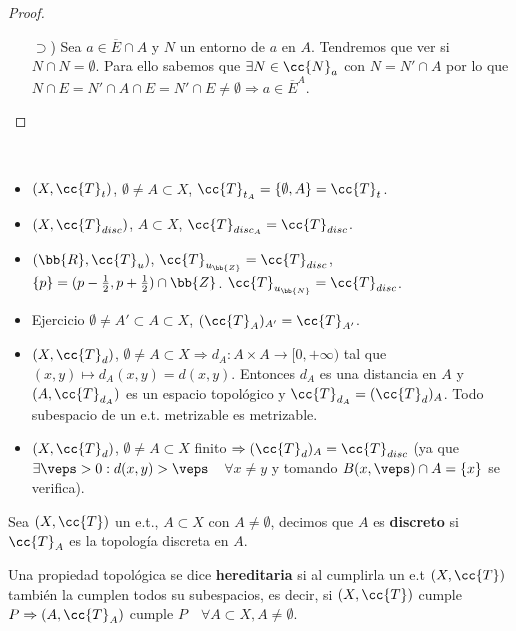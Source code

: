 \begin{prop}
\begin{proof}
\begin{enumerate}
\begin{itemize}
                \item[$\supset$)] Sea $a \in \overline{E}\cap A$ y $N$ un entorno de $a$ en $A$. Tendremos que ver si $N\cap N = \emptyset$. Para ello sabemos que $\exists N \in \cc{N}_a$ con $N=N'\cap A$ por lo que $N\cap E = N'\cap A \cap E = N' \cap E \neq \emptyset\Rightarrow a \in \overline{E}^A$.
            \end{itemize} 
        \end{enumerate}
    \end{proof}
\end{prop}

\begin{ejemplo}\
    \begin{itemize}
        \item $(X, \cc{T}_t)$, $\emptyset \neq A \subset X$, $\cc{T}_{t_A} = \{\emptyset, A\} = \cc{T}_t$.
        \item $(X, \cc{T}_{disc})$, $A\subset X$, $\cc{T}_{disc_A}=\cc{T}_{disc}$.
        \item $(\bb{R}, \cc{T}_u)$, $\cc{T}_{u_\bb{Z}} = \cc{T}_{disc}$, $\{p\} = (p-\frac{1}{2}, p+\frac{1}{2})\cap \bb{Z}$.
        $\cc{T}_{u_\bb{N}} = \cc{T}_{disc}$.
        \item Ejercicio $\emptyset \neq A' \subset A \subset X$, $(\cc{T}_A)_{A'} = \cc{T}_{A'}$.
        \item $(X, \cc{T}_d)$, $\emptyset\neq A \subset X \Rightarrow d_A: A\times A \to [0,+\infty)$ tal que $(x,y)\mapsto d_A(x,y) = d(x,y)$.
        Entonces $d_A$ es una distancia en $A$ y $(A, \cc{T}_{d_A})$ es un espacio topológico y $\cc{T}_{d_A} = (\cc{T}_d)_A$. Todo subespacio de un e.t. metrizable es metrizable.
        \item $(X, \cc{T}_d)$, $\emptyset \neq A \subset X$ finito $\Rightarrow (\cc{T}_d)_A = \cc{T}_{disc}$ (ya que $\exists \veps >0 : d(x,y)>\veps$\ \ $\forall x \neq y$ y tomando $B(x, \veps)\cap A =\{x\}$ se verifica).
    \end{itemize}
    \endsquare
\end{ejemplo}

\begin{definicion}
    Sea $(X, \cc{T})$ un e.t., $A\subset X$ con $A\neq \emptyset$, decimos que $A$ es \textbf{discreto} si $\cc{T}_A$ es la topología discreta en $A$.
    \endsquare
\end{definicion}

\begin{definicion}
    Una propiedad topológica se dice \textbf{hereditaria} si al cumplirla un e.t $(X, \cc{T})$ también la cumplen todos su subespacios, es decir, si $(X, \cc{T})$ cumple $P \Rightarrow (A, \cc{T}_A)$ cumple $P$\ \ $\forall A \subset X, A\neq \emptyset$.
    \endsquare
\end{definicion}

